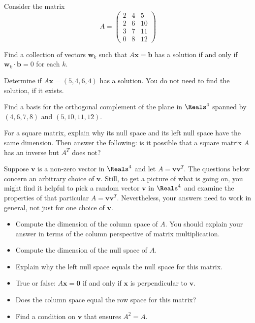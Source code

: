 \documentclass[minion]{homework}
\newcommand{\vx}{\mathbf{x}}
\newcommand{\vb}{\mathbf{b}}
\newcommand{\vv}{\mathbf{v}}
\newcommand{\vw}{\mathbf{w}}
\newcommand{\vzero}{\mathbf{0}}
\begin{document}
\begin{aproblems}
\aproblem
Consider the matrix
\[
A=\begin{pmatrix} 2 & 4 & 5 \\
2 & 6 & 10\\
3 & 7 & 11 \\
0 & 8 & 12
\end{pmatrix}
\]
\begin{subproblems}
\item Find a collection of vectors $\vw_k$ such that $A\vx=\vb$
has a solution if and only if $\vw_k\cdot\vb=0$ for each $k$.
\item Determine if $A\vx = (5,4,6,4)$ has a solution.  You 
do not need to find the solution, if it exists.
\end{subproblems}

\aproblem Find a basis for the orthogonal complement
of the plane in $\Reals^4$ spanned by $(4,6,7,8)$ and $(5,10,11,12)$.

\aproblem For a square matrix, explain why its null space and its
left null space have the same dimension.  Then answer the following:
is it possible that a square matrix $A$ has an inverse but $A^T$ does not?

\aproblem Suppose $\vv$ is a non-zero 
vector in $\Reals^4$ and let $A=\vv\vv^T$.  The questions
below concern an arbitrary choice of $\vv$. Still, to get a picture
of what is going on, you might find it helpful to pick a random vector
$\vv$ in $\Reals^4$ and examine the properties of that particular $A=\vv\vv^T$.
Nevertheless, your answers need to work in general, not just for one choice
of $\vv$.
\begin{itemize}
	\item Compute the dimension of the column space of $A$.  You should explain
	your answer in terms of the column perspective of matrix multiplication. 
	\item Compute the dimension of the null space of $A$.
	\item Explain why the left null space equals the null space for this matrix.
	\item True or false: $A\vx = \vzero$ if and only if $\vx$ is perpendicular
	to $\vv$.
	\item Does the column space equal the row space for this matrix?
	\item Find a condition on $\vv$ that ensures $A^2=A$.
\end{itemize}

\aproblem 

\end{aproblems}
\end{document}
